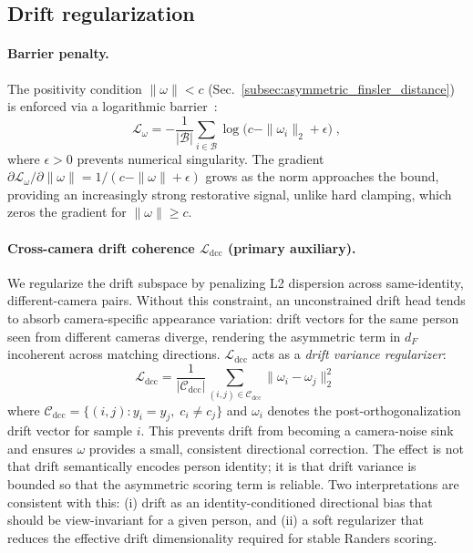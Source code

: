 \subsection{Drift regularization} \label{subsec:drift_regularization}
\label{subsec:drift_norm_regularization}\label{subsec:drift_aux_losses}%

\paragraph{Barrier penalty.}
The positivity condition $\|\omega\|<c$ (Sec.~\ref{subsec:asymmetric_finsler_distance}) is enforced via a logarithmic barrier~\cite{boyd2004convex}:
\begin{equation}
    \mathcal{L}_\omega = -\frac{1}{|\mathcal{B}|}\sum_{i \in \mathcal{B}} \log\!\bigl(c - \|\omega_i\|_2 + \epsilon\bigr) \;,
    \label{eq:omega_regularization}
\end{equation}
where $\epsilon > 0$ prevents numerical singularity. The gradient $\partial \mathcal{L}_\omega / \partial \|\omega\| = 1/(c - \|\omega\| + \epsilon)$ grows as the norm approaches the bound, providing an increasingly strong restorative signal, unlike hard clamping, which zeros the gradient for $\|\omega\| \geq c$.

\paragraph{Cross-camera drift coherence $\mathcal{L}_{\mathrm{dcc}}$ (primary auxiliary).}
We regularize the drift subspace by penalizing L2 dispersion across same-identity, different-camera pairs. Without this constraint, an unconstrained drift head tends to absorb camera-specific appearance variation: drift vectors for the same person seen from different cameras diverge, rendering the asymmetric term in $d_F$ incoherent across matching directions. $\mathcal{L}_{\mathrm{dcc}}$ acts as a \emph{drift variance regularizer}:
\begin{equation}
    \mathcal{L}_{\mathrm{dcc}} = \frac{1}{|\mathcal{C}_{\mathrm{dcc}}|}\sum_{(i,j)\in\mathcal{C}_{\mathrm{dcc}}} \|\omega_i - \omega_j\|_2^2 \;
    \label{eq:loss_dcc}
\end{equation}
where $\mathcal{C}_{\mathrm{dcc}} = \{(i,j): y_i = y_j,\; c_i \neq c_j \}$ and $\omega_i$ denotes the post-orthogonalization drift vector for sample $i$. This prevents drift from becoming a camera-noise sink and ensures $\omega$ provides a small, consistent directional correction. The effect is not that drift semantically encodes person identity; it is that drift variance is bounded so that the asymmetric scoring term is reliable. Two interpretations are consistent with this: (i) drift as an identity-conditioned directional bias that should be view-invariant for a given person, and (ii) a soft regularizer that reduces the effective drift dimensionality required for stable Randers scoring.

